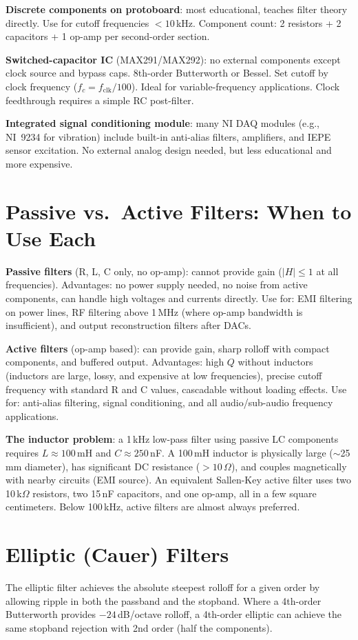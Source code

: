 \documentclass[11pt,letterpaper,twoside,openany]{book}
\begin{document}
\textbf{Discrete components on protoboard}: most educational, teaches filter theory directly. Use for cutoff frequencies $< 10$\,kHz. Component count: 2 resistors + 2 capacitors + 1 op-amp per second-order section.

\textbf{Switched-capacitor IC} (MAX291/MAX292): no external components except clock source and bypass caps. 8th-order Butterworth or Bessel. Set cutoff by clock frequency ($f_c = f_{\text{clk}}/100$). Ideal for variable-frequency applications. Clock feedthrough requires a simple RC post-filter.

\textbf{Integrated signal conditioning module}: many NI DAQ modules (e.g., NI~9234 for vibration) include built-in anti-alias filters, amplifiers, and IEPE sensor excitation. No external analog design needed, but less educational and more expensive.
\section{Passive vs.\ Active Filters: When to Use Each}
\textbf{Passive filters} (R, L, C only, no op-amp): cannot provide gain ($|H| \leq 1$ at all frequencies). Advantages: no power supply needed, no noise from active components, can handle high voltages and currents directly. Use for: EMI filtering on power lines, RF filtering above 1\,MHz (where op-amp bandwidth is insufficient), and output reconstruction filters after DACs.

\textbf{Active filters} (op-amp based): can provide gain, sharp rolloff with compact components, and buffered output. Advantages: high $Q$ without inductors (inductors are large, lossy, and expensive at low frequencies), precise cutoff frequency with standard R and C values, cascadable without loading effects. Use for: anti-alias filtering, signal conditioning, and all audio/sub-audio frequency applications.

\textbf{The inductor problem}: a 1\,kHz low-pass filter using passive LC components requires $L \approx 100$\,mH and $C \approx 250$\,nF. A 100\,mH inductor is physically large ($\sim$25\,mm diameter), has significant DC resistance ($> 10\,\Omega$), and couples magnetically with nearby circuits (EMI source). An equivalent Sallen-Key active filter uses two 10\,k$\Omega$ resistors, two 15\,nF capacitors, and one op-amp, all in a few square centimeters. Below 100\,kHz, active filters are almost always preferred.

\section{Elliptic (Cauer) Filters}
The elliptic filter achieves the absolute steepest rolloff for a given order by allowing ripple in both the passband and the stopband. Where a 4th-order Butterworth provides $-24$\,dB/octave rolloff, a 4th-order elliptic can achieve the same stopband rejection with 2nd order (half the components).
\end{document}
